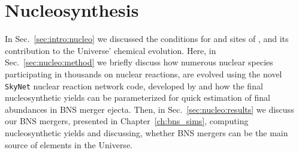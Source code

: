 
\chapter{Nucleosynthesis} \label{ch:nucleo}%




%
In Sec.~\ref{sec:intro:nucleo} we discussed the conditions for and sites of
\rproc{} \nuc{}, and its contribution to the Universe' chemical evolution. 
%
Here, in Sec.~\ref{sec:nucleo:method} we briefly discuss how numerous nuclear 
species participating in 
thousands on nuclear reactions, are evolved using the novel \texttt{SkyNet} 
nuclear reaction network code, developed by \citet{Lippuner:2017tyn,Lippuner:2018phd} 
and how the final nucleosynthetic yields can be parameterized for quick 
estimation of final abundances in \ac{BNS} merger ejecta.
%
Then, in Sec.~\ref{sec:nucleo:results} we discuss our \ac{BNS} mergers, 
presented in Chapter~\ref{ch:bns_sims}, computing nucleosynthetic yields 
and discussing, whether \ac{BNS} mergers can be the main source of \rproc{} 
elements in the Universe. 






